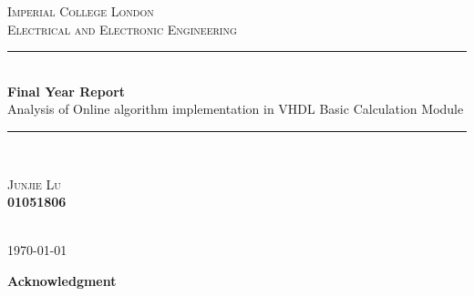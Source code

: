 \documentclass[10pt]{article}
\begin{document}

\begin{titlepage} %
	\newcommand{\HRule}{\rule{\linewidth}{0.5mm}} %
	
\begin{center} %
	
	
	\textsc{\LARGE Imperial College London}\\[1.5cm] %
	
	\textsc{\Large Electrical and Electronic Engineering}\\[0.5cm] %
	
	
	
	
	\HRule\\[0.4cm]
	

	    

	{\huge\bfseries Final Year Report \\[0.4cm]}%
	{\LARGE Analysis of Online algorithm implementation in VHDL Basic Calculation Module}
	\HRule\\[1.5cm]
	
		\begin{center}
			\Large
			\textsc{Junjie Lu}\\
			\textsc{\textbf{01051806}}\\
			\\
		\end{center}



	
	{\large\today} 
\end{center}
\end{titlepage}

\tableofcontents
\newpage
{\LARGE\bfseries Acknowledgment}\\
\end{document}
